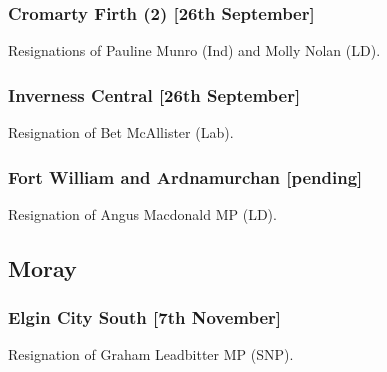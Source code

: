 \documentclass[a4paper,openany]{book}
\begin{document}
\begin{resultsiii}
\subsubsection*{Cromarty Firth (2) \hspace*{\fill}\nolinebreak[1]%
	\enspace\hspace*{\fill}
	[26th September]}


Resignations of Pauline Munro (Ind) and Molly Nolan (LD).

\subsubsection*{Inverness Central \hspace*{\fill}\nolinebreak[1]%
	\enspace\hspace*{\fill}
	[26th September]}


Resignation of Bet McAllister (Lab).

\subsubsection*{Fort William and Ardnamurchan \hspace*{\fill}\nolinebreak[1]%
	\enspace\hspace*{\fill}
	[pending]}


Resignation of Angus Macdonald MP (LD).

\subsection*{Moray}

\subsubsection*{Elgin City South \hspace*{\fill}\nolinebreak[1]%
	\enspace\hspace*{\fill}
	[7th November]}


Resignation of Graham Leadbitter MP (SNP).


\end{resultsiii}
\end{document}
